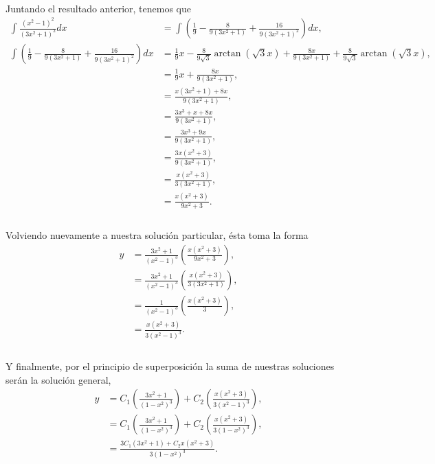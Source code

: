 \documentclass{article}
\begin{document}
\paragraph{}Juntando el resultado anterior, tenemos que 
\begin{align*}
\int \frac{(x^2 - 1)^2}{(3x^2 + 1)^2} dx &= \int \left(\frac{1}{9} - \frac{8}{9(3x^2 + 1)} + \frac{16}{9(3x^2 + 1)^2} \right)dx,\\
\int \left(\frac{1}{9} - \frac{8}{9(3x^2 + 1)} + \frac{16}{9(3x^2 + 1)^2} \right)dx &= \frac{1}{9}x -\frac{8}{9\sqrt{3}} \arctan{(\sqrt{3}x)} +\frac{8x}{9(3x^2 + 1)} + \frac{8}{9\sqrt{3}}\arctan{(\sqrt{3}x)},\\
&= \frac{1}{9}x +\frac{8x}{9(3x^2 + 1)},\\
&= \frac{x(3x^2+1) + 8x}{9(3x^2 + 1)},\\
&= \frac{3x^3 + x + 8x}{9(3x^2 + 1)},\\
&= \frac{3x^3 + 9x}{9(3x^2 + 1)},\\
&= \frac{3x(x^2 + 3)}{9(3x^2 + 1)},\\
&= \frac{x(x^2 + 3)}{3(3x^2 + 1)},\\
&= \frac{x(x^2 + 3)}{9x^2 + 3}.\\
\end{align*}
\paragraph{}Volviendo nuevamente a nuestra solución particular, ésta toma la forma
\begin{align*}
y &= \frac{3x^2+1}{(x^2-1)^3}\left(\frac{x(x^2 + 3)}{9x^2 + 3}\right),\\
&= \frac{3x^2+1}{(x^2-1)^3}\left(\frac{x(x^2 + 3)}{3(3x^2 + 1)}\right),\\
&= \frac{1}	{(x^2-1)^3}\left(\frac{x(x^2 + 3)}{3}\right),\\
&= \frac{x(x^2 + 3)}{3(x^2-1)^3}.\\
\end{align*}
\paragraph{}Y finalmente, por el principio de superposición la suma de nuestras soluciones serán la solución general,
\begin{align*}
y &= C_1\left(\frac{3x^2 + 1}{(1-x^2)^3}\right) + C_2 \left(\frac{x(x^2 + 3)}{3(x^2-1)^3}\right),\\
&= C_1\left(\frac{3x^2 + 1}{(1-x^2)^3}\right) + C_2 \left(\frac{x(x^2 + 3)}{3(1 - x^2)^3}\right),\\
&= \frac{3C_1(3x^2+ 1) + C_2 x(x^2 + 3)}{3(1-x^2)^3}.
\end{align*}
\end{document}
